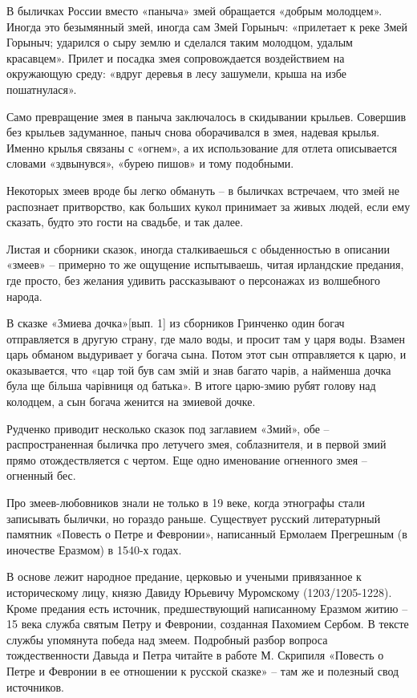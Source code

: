 В быличках России вместо «паныча» змей обращается «добрым молодцем». Иногда это безымянный змей, иногда сам Змей Горыныч: «прилетает к реке Змей Горыныч; ударился о сыру землю и сделался таким молодцом, удалым красавцем». Прилет и посадка змея сопровождается воздействием на окружающую среду: «вдруг деревья в лесу зашумели, крыша на избе пошатнулася».

Само превращение змея в паныча заключалось в скидывании крыльев. Совершив без крыльев задуманное, паныч снова оборачивался в змея, надевая крылья. Именно крылья связаны с «огнем», а их использование для отлета описывается словами «здвынувся», «бурею пишов» и тому подобными.

Некоторых змеев вроде бы легко обмануть – в быличках встречаем, что змей не распознает притворство, как больших кукол принимает за живых людей, если ему сказать, будто это гости на свадьбе, и так далее.

Листая и сборники сказок, иногда сталкиваешься с обыденностью в описании «змеев» – примерно то же ощущение испытываешь, читая ирландские предания, где просто, без желания удивить рассказывают о персонажах из волшебного народа. 

В сказке «Змиева дочка»[вып. 1]\cite{grinetnochern} из сборников Гринченко один богач отправляется в другую страну, где мало воды, и просит там у царя воды. Взамен царь обманом выдуривает у богача сына. Потом этот сын отправляется к царю, и оказывается, что «цар той був сам змій и знав багато чарів, а найменша дочка була ще більша чарівниця од батька». В итоге царю-змию рубят голову над колодцем, а сын богача женится на змиевой дочке. 

Рудченко приводит\cite{rudskazki} несколько сказок под заглавием «Змий», обе – распространенная быличка про летучего змея, соблазнителя, и в первой змий прямо отождествляется с чертом. Еще одно именование огненного змея – огненный бес.

Про змеев-любовников знали не только в 19 веке, когда этнографы стали записывать былички, но гораздо раньше. Существует русский литературный памятник «Повесть о Петре и Февронии», написанный Ермолаем Прегрешным (в иночестве Еразмом) в 1540-х годах.

В основе лежит народное предание, церковью и учеными привязанное к историческому лицу, князю Давиду Юрьевичу Муромскому (1203/1205-1228).  Кроме предания есть источник, предшествующий написанному Еразмом житию – 15 века служба святым Петру и Февронии, созданная Пахомием Сербом. В тексте службы упомянута победа над змеем. Подробный разбор вопроса тождественности Давыда и Петра читайте в работе М. Скрипиля «Повесть о Петре и Февронии в ее отношении к русской сказке»\cite[том VII]{trudy-aknauk-otdel-drevsuslit} – там же и полезный свод источников.

